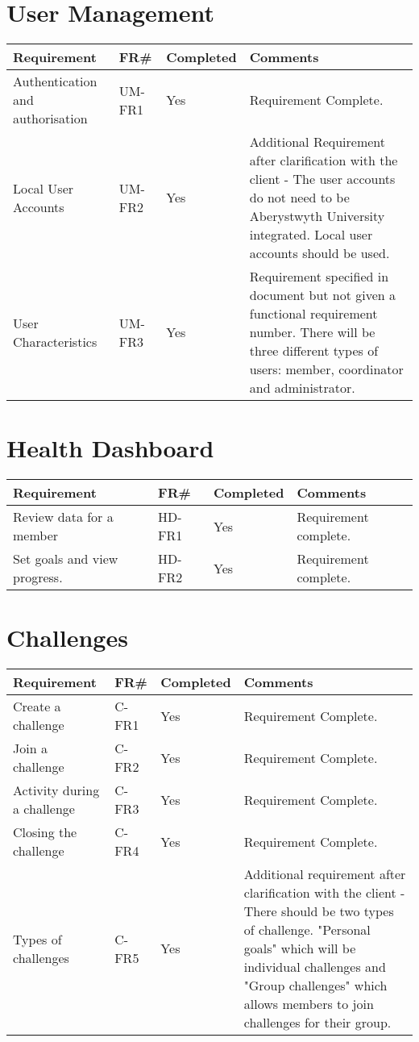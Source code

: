 \section{User Management}
\begin{tabular}{ |p{5cm}|l|l|p{8cm}|}
\hline
\textbf{Requirement}	&	\textbf{FR\#}	&	\textbf{Completed}	&	\textbf{Comments} \\
\hline
Authentication and authorisation 					& UM-FR1 	& Yes 		& Requirement Complete. \\
\hline
Local User Accounts 								& UM-FR2 	& Yes 		& Additional Requirement after clarification with the client - The user accounts do not need to be Aberystwyth University integrated. Local user accounts should be used. \\
\hline
User Characteristics								& UM-FR3	& Yes		& Requirement specified in document but not given a functional requirement number. There will be three different types of users: member, coordinator and administrator. \\

\hline
\end{tabular}



\section{Health Dashboard}
\begin{tabular}{ |p{5cm}|l|l|p{8cm}|}
\hline
\textbf{Requirement}	&	\textbf{FR\#}	&	\textbf{Completed}	&	\textbf{Comments} \\
\hline
Review data for a member 							& HD-FR1 	& Yes 		& Requirement complete. \\
\hline
Set goals and view progress. 						& HD-FR2 	& Yes		& Requirement complete. \\

\hline
\end{tabular}


\section{Challenges}
\begin{tabular}{ |p{5cm}|l|l|p{8cm}|}
\hline
\textbf{Requirement}	&	\textbf{FR\#}	&	\textbf{Completed}	&	\textbf{Comments} \\
\hline
Create a challenge 									& C-FR1 	& Yes 		& Requirement Complete. \\
\hline
Join a challenge 									& C-FR2 	& Yes  		& Requirement Complete. \\
\hline
Activity during a challenge							& C-FR3 	& Yes 		& Requirement Complete. \\
\hline
Closing the challenge								& C-FR4		& Yes 		& Requirement Complete. \\
\hline
Types of challenges 								& C-FR5 	& Yes		& Additional requirement after clarification with the client - There should be two types of challenge. "Personal goals" which will be individual challenges and "Group challenges" which allows members to join challenges for their group. \\

\hline
\end{tabular}


